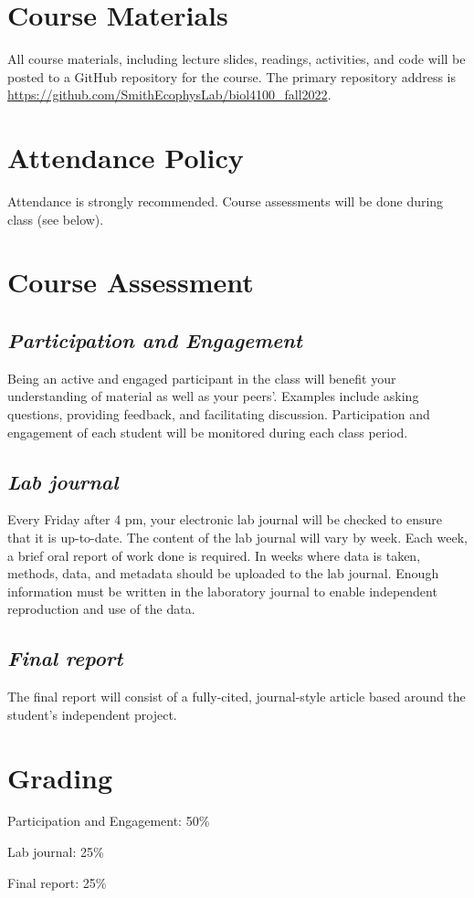 \documentclass[12pt, notitlepage]{article}   	%
\begin{document}
{\section{Course Materials}
All course materials, including lecture slides, readings, activities, and code 
will be posted to a GitHub repository for the course.
The primary repository address is
\url{https://github.com/SmithEcophysLab/biol4100_fall2022}.

\section{Attendance Policy}
Attendance is strongly recommended. 
Course assessments will be done during class (see below).

\section{Course Assessment}
\subsection{\textit{Participation and Engagement}}
Being an active and engaged participant in the class will benefit your understanding
of material as well as your peers'. Examples include asking questions, providing feedback,
and facilitating discussion. Participation and engagement of each student will be monitored
during each class period.

\subsection{\textit{Lab journal}}
Every Friday after 4 pm, your electronic lab journal will be checked to ensure that it 
is up-to-date. The content of the lab journal will vary by week. 
Each week, a brief oral report of work done is required. 
In weeks where data is taken, methods, data, and metadata 
should be uploaded to the lab journal. Enough information must be written in the 
laboratory journal to enable independent reproduction and use of the data.

\subsection{\textit{Final report}}
The final report will consist of a fully-cited, journal-style article based around the 
student’s independent project.

\section{Grading}
Participation and Engagement: 50\% \par
Lab journal: 25\% \par
Final report: 25\% \par

}
\end{document}
